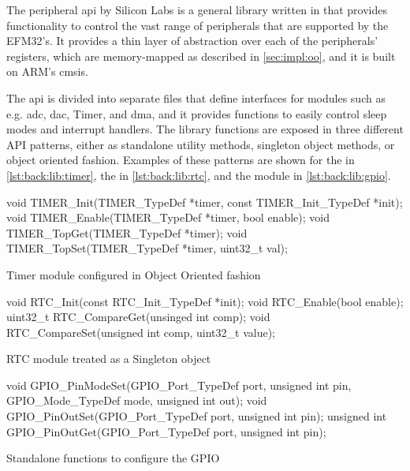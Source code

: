 The {\emlib} peripheral \gls{api} by Silicon Labs is a general library written in {\C} that provides functionality to control the vast range of peripherals that are supported by the EFM32's.
It provides a thin layer of abstraction over each of the peripherals' registers, which are memory-mapped as described in \autoref{sec:impl:oo}, and it is built on ARM's \gls{cmsis}.

The \gls{api} is divided into separate files that define interfaces for modules such as e.g. \gls{adc}, \gls{dac}, Timer, and \gls{dma}, and it provides functions to easily control sleep modes and interrupt handlers.
The library functions are exposed in three different API patterns, either as standalone utility methods, singleton object methods, or {\C} object oriented fashion.
Examples of these patterns are shown for the  in \autoref{lst:back:lib:timer}, the  in \autoref{lst:back:lib:rtc}, and the  module in \autoref{lst:back:lib:gpio}.

\begin{listing}[H]
  \begin{ccode}
void TIMER_Init(TIMER_TypeDef *timer,
                const TIMER_Init_TypeDef *init);
void TIMER_Enable(TIMER_TypeDef *timer, bool enable);
void TIMER_TopGet(TIMER_TypeDef *timer);
void TIMER_TopSet(TIMER_TypeDef *timer, uint32_t val);
  \end{ccode}
  \caption{Timer module configured in {\C} Object Oriented fashion}
  \label{lst:back:lib:timer}
\end{listing}

\begin{listing}[H]
  \begin{ccode}
void RTC_Init(const RTC_Init_TypeDef *init);
void RTC_Enable(bool enable);
uint32_t RTC_CompareGet(unsinged int comp);
void RTC_CompareSet(unsigned int comp, uint32_t value);
  \end{ccode}
  \caption{RTC module treated as a Singleton object}
  \label{lst:back:lib:rtc}
\end{listing}

\begin{listing}[H]
  \begin{ccode}
void GPIO_PinModeSet(GPIO_Port_TypeDef port, unsigned int pin,
                     GPIO_Mode_TypeDef mode, unsigned int out);
void GPIO_PinOutSet(GPIO_Port_TypeDef port, unsigned int pin);
unsigned int GPIO_PinOutGet(GPIO_Port_TypeDef port,
                            unsigned int pin);
  \end{ccode}
  \caption{Standalone functions to configure the GPIO}
  \label{lst:back:lib:gpio}
\end{listing}

